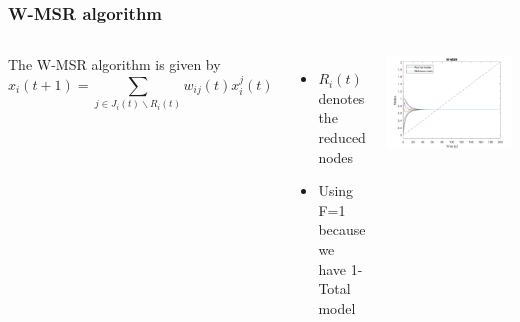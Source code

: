 \documentclass{beamer}
\begin{document}
\begin{frame}
\frametitle{W-MSR algorithm}
\begin{columns}[c] %

The W-MSR algorithm is given by
\begin{equation*}
x_i(t+1)=\sum_{j\in J_i(t)\backslash R_i(t)}w_{ij}(t)x^{j}_{i}(t)
\end{equation*}
\begin{itemize}
\item $R_i(t)$ denotes the reduced nodes
\item Using F=1 because we have 1-Total model
\end{itemize}

    
    \includegraphics[scale=0.32]{figures/W_MSR.png}
	\centering
\end{columns}

\end{frame}

\end{document}
